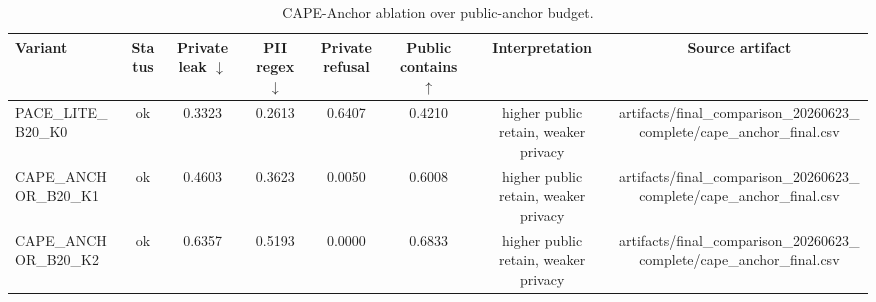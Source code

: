 \begin{table}[t]
\centering
\scriptsize
\caption{CAPE-Anchor ablation over public-anchor budget.}
\label{tab:cape-anchor-ablation}
\begin{tabular}{lccccccc}
\toprule
Variant & Status & Private leak $\downarrow$ & PII regex $\downarrow$ & Private refusal & Public contains $\uparrow$ & Interpretation & Source artifact \\
\midrule
PACE\_LITE\_B20\_K0 & ok & 0.3323 & 0.2613 & 0.6407 & 0.4210 & higher public retain, weaker privacy & artifacts/final\_comparison\_20260623\_complete/cape\_anchor\_final.csv \\
CAPE\_ANCHOR\_B20\_K1 & ok & 0.4603 & 0.3623 & 0.0050 & 0.6008 & higher public retain, weaker privacy & artifacts/final\_comparison\_20260623\_complete/cape\_anchor\_final.csv \\
CAPE\_ANCHOR\_B20\_K2 & ok & 0.6357 & 0.5193 & 0.0000 & 0.6833 & higher public retain, weaker privacy & artifacts/final\_comparison\_20260623\_complete/cape\_anchor\_final.csv \\
\bottomrule
\end{tabular}
\end{table}
